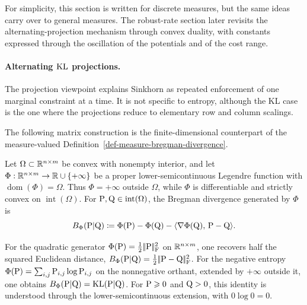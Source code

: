 For simplicity, this section is written for discrete measures, but the same ideas carry over to general measures. The robust-rate section later revisits the alternating-projection mechanism through convex duality, with constants expressed through the oscillation of the potentials and of the cost range.

\paragraph{Alternating $\KL$ projections.}

The projection viewpoint explains Sinkhorn as repeated enforcement of one marginal constraint at a time. It is not specific to entropy, although the KL case is the one where the projections reduce to elementary row and column scalings.

The following matrix construction is the finite-dimensional counterpart of the measure-valued Definition~\ref{def-measure-bregman-divergence}.

\begin{defn}\label{def-bregman-divergence}
	Let $\Omega\subset\RR^{n\times m}$ be convex with nonempty interior, and let $\Phi:\RR^{n\times m}\to\RR\cup\{+\infty\}$ be a proper lower-semicontinuous Legendre function with $\operatorname{dom}(\Phi)=\Omega$. Thus $\Phi=+\infty$ outside $\Omega$, while $\Phi$ is differentiable and strictly convex on $\operatorname{int}(\Omega)$. For $\P,\Q\in\operatorname{int}(\Omega)$, the Bregman divergence generated by $\Phi$ is
	\[
		B_\Phi(\P|\Q)\eqdef \Phi(\P)-\Phi(\Q)-\dotp{\nabla\Phi(\Q)}{\P-\Q}.
	\]
\end{defn}

For the quadratic generator $\Phi(\P)=\frac12\norm{\P}_{\mathrm F}^2$ on $\RR^{n\times m}$, one recovers half the squared Euclidean distance, $B_\Phi(\P|\Q)=\frac12\norm{\P-\Q}_{\mathrm F}^2$. For the negative entropy $\Phi(\P)=\sum_{i,j}\P_{i,j}\log \P_{i,j}$ on the nonnegative orthant, extended by $+\infty$ outside it, one obtains $B_\Phi(\P|\Q)=\KLD(\P|\Q)$. For $\P\geq0$ and $\Q>0$, this identity is understood through the lower-semicontinuous extension, with $0\log0=0$.

